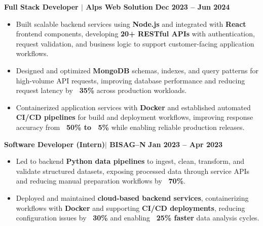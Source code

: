 \documentclass{article}
\begin{document}
\vspace{3mm}
{\large \noindent \textbf{Full Stack Developer $\mid$ Alps Web Solution}} \hfill \textbf{Dec 2023 – Jun 2024}
\vspace{1mm}

{\small
\begin{itemize}[noitemsep, nolistsep, leftmargin=*, itemsep=1mm]

\item Built scalable backend services using \textbf{Node.js} and integrated with \textbf{React} frontend components, developing \textbf{20+ RESTful APIs} with authentication, request validation, and business logic to support customer-facing application workflows.

\item Designed and optimized \textbf{MongoDB} schemas, indexes, and query patterns for high-volume API requests, improving database performance and reducing request latency by \textbf{~35\%} across production workloads.

\item Containerized application services with \textbf{Docker} and established automated \textbf{CI/CD pipelines} for build and deployment workflows, improving response accuracy from \textbf{~50\% to ~5\%} while enabling reliable production releases.

\end{itemize}
}

\vspace{3mm}
{\large \noindent \textbf{Software Developer (Intern)$\mid$ BISAG--N}} \hfill \textbf{Jan 2023 – Apr 2023}
\vspace{1mm}

{\small
\begin{itemize}[noitemsep, nolistsep, leftmargin=*, itemsep=1mm]

\item Led to backend \textbf{Python data pipelines} to ingest, clean, transform, and validate structured datasets, exposing processed data through service APIs and reducing manual preparation workflows by \textbf{~70\%}.

\item Deployed and maintained \textbf{cloud-based backend services}, containerizing workflows with \textbf{Docker} and supporting \textbf{CI/CD deployments}, reducing configuration issues by \textbf{~30\%} and enabling \textbf{~25\% faster} data analysis cycles.

\end{itemize}
}
\end{document}
